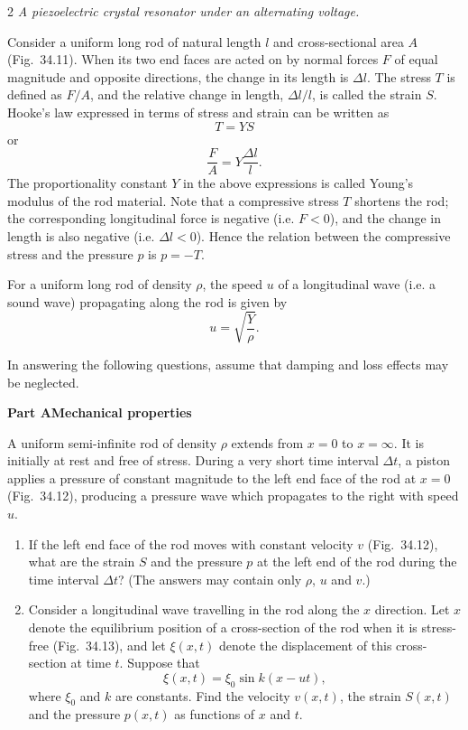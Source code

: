 \begin{problem}{2}
\emph{A piezoelectric crystal resonator under an alternating voltage.}

Consider a uniform long rod of natural length $l$ and cross-sectional area $A$ (Fig.~34.11). When its two end faces are acted on by normal forces $F$ of equal magnitude and opposite directions, the change in its length is $\Delta l$. The stress $T$ is defined as $F/A$, and the relative change in length, $\Delta l/l$, is called the strain $S$. Hooke's law expressed in terms of stress and strain can be written as
\[
T=YS
\]
or
\begin{equation}
\frac{F}{A}=Y\frac{\Delta l}{l}. \tag{1}
\end{equation}
The proportionality constant $Y$ in the above expressions is called Young's modulus of the rod material. Note that a compressive stress $T$ shortens the rod; the corresponding longitudinal force is negative (i.e. $F<0$), and the change in length is also negative (i.e. $\Delta l<0$). Hence the relation between the compressive stress and the pressure $p$ is $p=-T$.

For a uniform long rod of density $\rho$, the speed $u$ of a longitudinal wave (i.e. a sound wave) propagating along the rod is given by
\begin{equation}
u=\sqrt{\frac{Y}{\rho}}. \tag{2}
\end{equation}

In answering the following questions, assume that damping and loss effects may be neglected.

\textbf{Part A\quad Mechanical properties}

A uniform semi-infinite rod of density $\rho$ extends from $x=0$ to $x=\infty$. It is initially at rest and free of stress. During a very short time interval $\Delta t$, a piston applies a pressure of constant magnitude to the left end face of the rod at $x=0$ (Fig.~34.12), producing a pressure wave which propagates to the right with speed $u$.

\begin{enumerate}[label=(\alph*),leftmargin=2.2em,itemsep=1pt]
\item If the left end face of the rod moves with constant velocity $v$ (Fig.~34.12), what are the strain $S$ and the pressure $p$ at the left end of the rod during the time interval $\Delta t$? (The answers may contain only $\rho$, $u$ and $v$.)
\item Consider a longitudinal wave travelling in the rod along the $x$ direction. Let $x$ denote the equilibrium position of a cross-section of the rod when it is stress-free (Fig.~34.13), and let $\xi(x,t)$ denote the displacement of this cross-section at time $t$. Suppose that
\begin{equation}
\xi(x,t)=\xi_0\sin k(x-ut), \tag{3}
\end{equation}
where $\xi_0$ and $k$ are constants. Find the velocity $v(x,t)$, the strain $S(x,t)$ and the pressure $p(x,t)$ as functions of $x$ and $t$.
\end{enumerate}


\end{problem}
